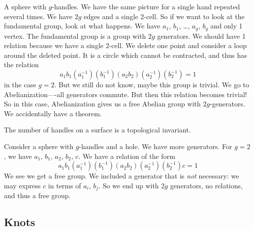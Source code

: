 \begin{ex}
A sphere with $g$-handles. We have the same picture for a single
hand repeated several times. We have $2g$ edges and a single
2-cell. So if we want to look at the fundamental group, look at
what happens. We have $a_1$, $b_1$, \dots, $a_g$, $b_g$ and only
1 vertex. The fundamental group is a group with $2g$
generators. We should have 1 relation because we have a single
2-cell. We delete one point and consider a loop around the
deleted point. It is a circle which cannot be contracted, and
thus has the relation
\begin{equation}
a_1b_1(a_{1}^{-1})(b_{1}^{-1})(a_2b_2)(a^{-1}_{2})(b^{-1}_{2})=1
\end{equation}
in the case $g=2$. But we still do not know, maybe this group is
trivial. We go to Abelianization----all generators commute. But
then this relation becomes trivial! So in this case,
Abelianization gives us a free Abelian group with
$2g$-generators. We accidentally have a theorem.
\end{ex}

\begin{thm}
The number of handles on a surface is a topological invariant.
\end{thm}

\begin{ex}
Consider a sphere with $g$-handles and a hole. We have more
generators. For $g=2$, we have $a_1$, $b_1$, $a_2$, $b_2$,
$c$. We have a relation of the form
\begin{equation}
a_1b_1(a_{1}^{-1})(b_{1}^{-1})(a_2b_2)(a^{-1}_{2})(b^{-1}_{2})c=1
\end{equation}
We see we get a free group. We included a generator that is
\emph{not} necessary: we may express $c$ in terms of $a_i$,
$b_j$. So we end up with $2g$ generators, no relations, and thus
a free group.
\end{ex}

\subsection{Knots}

